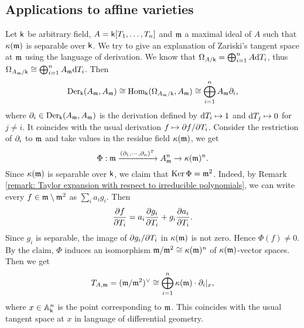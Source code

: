 \subsection{Applications to affine varieties}


    Let \(\kk\) be arbitrary field, \(A = \kk[T_1, \ldots, T_n]\) and \(\frakm\) a maximal ideal of \(A\) such that \(\rkk(\frakm)\) is separable over \(\kk\).
    We try to give an explanation of Zariski's tangent space at \(\frakm\) using the language of derivation.
    We know that \( \Omega_{A/\kk} = \bigoplus_{i=1}^n A \d T_i \), thus \(\Omega_{A_\frakm/\kk} \cong \bigoplus_{i=1}^n A_\frakm \d T_i\). 
    Then 
    \[ \Der_\kk(A_\frakm, A_\frakm) \cong \Hom_\kk(\Omega_{A_\frakm/\kk}, A_\frakm) \cong \bigoplus_{i=1}^n A_\frakm \P_i, \]
    where \(\P_i \in \Der_\kk(A_\frakm, A_\frakm)\) is the derivation defined by \(\d T_i \mapsto 1\) and \(\d T_j \mapsto 0\) for \(j \neq i\).
    It coincides with the usual derivation \(f \mapsto \P f/ \P T_i\).
    Consider the restriction of \(\P_i\) to \(\frakm\) and take values in the residue field \(\rkk(\frakm)\), we get 
    \[ \Phi : \frakm \xrightarrow{(\P_1,\cdots,\P_n)^T} A_\frakm^n \to \rkk(\frakm)^n.\]
    Since \(\rkk(\frakm)\) is separable over \(\kk\), we claim that \(\Ker \Phi = \frakm^2\).
    Indeed, by Remark \ref{remark: Taylor expansion with respect to irreducible polynomials}, we can write every \(f \in \frakm \setminus \frakm^2\) as \(\sum_i a_i g_i\).
    Then 
    \[ \frac{\P f}{\P T_i} = a_i \frac{\P g_i}{\P T_i} + g_i \frac{\P a_i}{\P T_i}. \]
    Since \(g_i\) is separable, the image of \(\P g_i/\P T_i\) in \(\rkk(\frakm)\) is not zero.
    Hence \(\Phi(f) \neq 0\).
    By the claim, \(\Phi\) induces an isomorphism \( \frakm/{\frakm^2} \cong \rkk(\frakm)^n \) of \(\rkk(\frakm)\)-vector spaces.
    Then we get 
    \[ T_{A,\frakm} = (\frakm/\frakm^2)^\lor \cong \bigoplus_{i=1}^n \rkk(\frakm)\cdot \P_i|_x, \]
    where \(x \in \bba_\kk^n\) is the point corresponding to \(\frakm\).
    This coincides with the usual tangent space at \(x\) in language of differential geometry.

